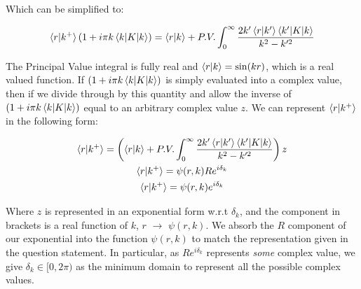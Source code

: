 \documentclass{article}
\begin{document}
			Which can be simplified to:
			
			\begin{gather}
				\braket{r|k^+}(1+i\pi k \braket{k|K|k}) = \braket{r|k} +  P.V. \int_{0}^{\infty}\frac{2k'\braket{r|k'}\braket{k'|K|k}}{k^2-k'^2}
			\end{gather}
			
			The Principal Value integral is fully real and $\braket{r|k} = \sin(kr)$, which is a real valued function. If $(1+i\pi k \braket{k|K|k})$ is simply evaluated into a complex value, then if we divide through by this quantity and allow the inverse of $(1+i\pi k \braket{k|K|k})$ equal to an arbitrary complex value $z$.
			We can represent $\braket{r|k^+}$ in the following form:
			
			\begin{gather}
				\braket{r|k^+} = \left(\braket{r|k} + P.V. \int_{0}^{\infty}\frac{2k'\braket{r|k'}\braket{k'|K|k}}{k^2-k'^2}\right) z\\
				\braket{r|k^+} = \psi(r,k)Re^{i\delta_k}\\
				\braket{r|k^+} = \psi(r,k)e^{i\delta_k}
			\end{gather}
			
			Where $z$ is represented in an exponential form w.r.t $\delta_k$, and the component in brackets is a real function of $k$, $r$ $\to$ $\psi(r,k)$. We absorb the $R$ component of our exponential into the function $\psi(r,k)$ to match the representation given in the question statement.
			In particular, as $Re^{i\delta_k}$ represents \textit{some} complex value, we give $\delta_k \in [0,2\pi)$ as the minimum domain to represent all the possible complex values. 
		
			
			
			
\end{document}
